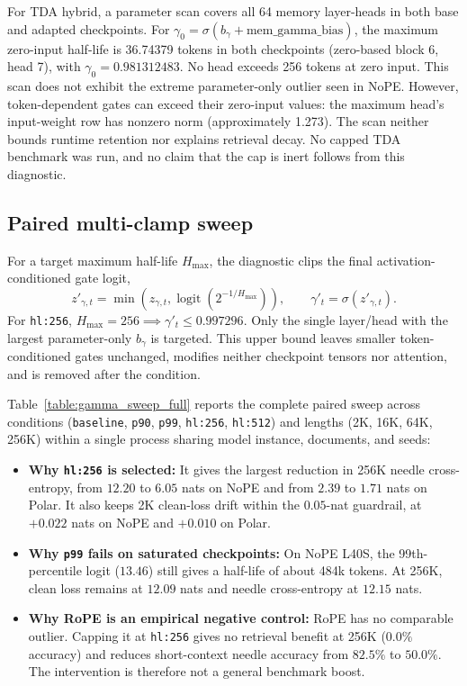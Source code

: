 For TDA hybrid, a parameter scan covers all 64 memory layer-heads in both base and adapted checkpoints. For $\gamma_0=\sigma(b_\gamma+\mathrm{mem\_gamma\_bias})$, the maximum zero-input half-life is 36.74379 tokens in both checkpoints (zero-based block 6, head 7), with $\gamma_0=0.981312483$. No head exceeds 256 tokens at zero input. This scan does not exhibit the extreme parameter-only outlier seen in NoPE. However, token-dependent gates can exceed their zero-input values: the maximum head's input-weight row has nonzero norm (approximately 1.273). The scan neither bounds runtime retention nor explains retrieval decay. No capped TDA benchmark was run, and no claim that the cap is inert follows from this diagnostic.

\subsection{Paired multi-clamp sweep}
For a target maximum half-life $H_{\max}$, the diagnostic clips the final activation-conditioned gate logit,
\begin{equation}
 z'_{\gamma,t}=\min\!\left(z_{\gamma,t},\operatorname{logit}(2^{-1/H_{\max}})\right),\qquad
 \gamma'_t=\sigma(z'_{\gamma,t}).
\end{equation}
For \texttt{hl:256}, $H_{\max}=256 \implies \gamma'_t\leq0.997296$. Only the single layer/head with the largest parameter-only $b_\gamma$ is targeted. This upper bound leaves smaller token-conditioned gates unchanged, modifies neither checkpoint tensors nor attention, and is removed after the condition.

Table~\ref{table:gamma_sweep_full} reports the complete paired sweep across conditions (\texttt{baseline}, \texttt{p90}, \texttt{p99}, \texttt{hl:256}, \texttt{hl:512}) and lengths (2K, 16K, 64K, 256K) within a single process sharing model instance, documents, and seeds:
\begin{itemize}
  \item \textbf{Why \texttt{hl:256} is selected:} It gives the largest reduction in 256K needle cross-entropy, from $12.20$ to $6.05$ nats on NoPE and from $2.39$ to $1.71$ nats on Polar. It also keeps 2K clean-loss drift within the $0.05$-nat guardrail, at $+0.022$ nats on NoPE and $+0.010$ on Polar.
  \item \textbf{Why \texttt{p99} fails on saturated checkpoints:} On NoPE L40S, the 99th-percentile logit ($13.46$) still gives a half-life of about 484k tokens. At 256K, clean loss remains at $12.09$ nats and needle cross-entropy at $12.15$ nats.
  \item \textbf{Why RoPE is an empirical negative control:} RoPE has no comparable outlier. Capping it at \texttt{hl:256} gives no retrieval benefit at 256K ($0.0\%$ accuracy) and reduces short-context needle accuracy from $82.5\%$ to $50.0\%$. The intervention is therefore not a general benchmark boost.
\end{itemize}

